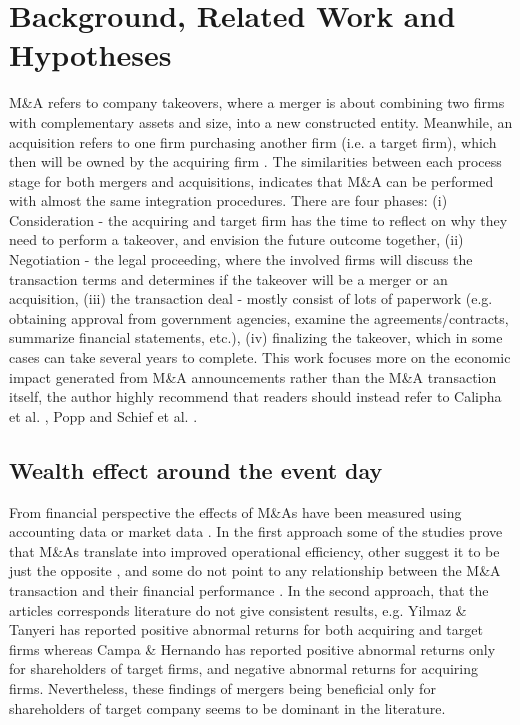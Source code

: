 \section{Background, Related Work and Hypotheses}\label{Sec2}



M\&A refers to company takeovers, where a merger is about combining two firms with complementary assets and size, into a new constructed entity. Meanwhile, an acquisition refers to one firm purchasing another firm (i.e. a target firm), which then will be owned by the acquiring firm \cite{vonGersdorff}. The similarities between each process stage for both mergers and acquisitions, indicates that M\&A can be performed with almost the same integration procedures. There are four phases: (i) Consideration - the acquiring and target firm has the time to reflect on why they need to perform a takeover, and envision the future outcome together, (ii) Negotiation - the legal proceeding, where the involved firms will discuss the transaction terms and determines if the takeover will be a merger or an acquisition, (iii) the transaction deal - mostly consist of lots of paperwork (e.g. obtaining approval from government agencies, examine the agreements/contracts, summarize financial statements, etc.), (iv) finalizing the takeover, which in some cases can take several years to complete. This work focuses more on the economic impact generated from M\&A announcements rather than the M\&A transaction itself, the author highly recommend that readers should instead refer to Calipha et al. \cite{calipha2010mergers}, Popp \cite{popp2013mergers} and Schief et al. \cite{schief2013mergers}.

\subsection{Wealth effect around the event day}

From financial perspective the effects of M\&As have been measured using accounting data \cite{Healy,Ghosh} or market data \cite{agrawal1992post}. In the first approach some of the studies prove that M\&As translate into improved operational efficiency, \cite{Healy} other suggest it to be just the opposite \cite{Kruse}, and some do not point to any relationship between the M\&A transaction and their financial performance \cite{Ghosh}. In the second approach, that the articles corresponds literature do not give consistent results, e.g. Yilmaz \& Tanyeri \cite{Yilmaz} has reported positive abnormal returns for both acquiring and target firms whereas Campa \& Hernando \cite{Campa} has reported positive abnormal returns only for shareholders of target firms, and negative abnormal returns for acquiring firms. Nevertheless, these findings of mergers being beneficial only for shareholders of target company seems to be dominant in the literature. 

